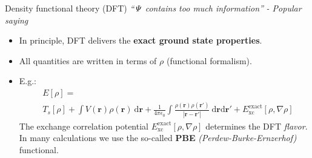 \documentclass[notes=hide]{beamer}
\begin{document}
\begin{frame}{Density functional theory (DFT)}
  \textit{``$ \it \Psi  $  contains too much information''}
  \hfill \textit{- Popular saying}
  \begin{itemize}
    \item In principle, DFT delivers the \textbf{exact ground state properties}.

    \item All quantities are written in terms of $ \rho $ (functional formalism).
    \item E.g.:
      \begin{align*}
        &E[ \rho ] =\\
        &T_{s} [ \rho  ]
        +
        \int  V ( \mathbf{r} ) \rho ( \mathbf{r} ) \ \mathrm{d} \mathbf{r}
        +
        \frac{1}{4\pi \epsilon _{0}}
        \int
        \frac{\rho ( \mathbf{r} ) \rho ( \mathbf{r}' )}{| \mathbf{r} - \mathbf{r}'|}
        \ \mathrm{d} \mathbf{r}\mathrm{d} \mathbf{r}'
        +
        E^{ \mathrm{exact}}_{ \mathrm{xc}} [ \rho, \nabla \rho  ]
      \end{align*}
      The exchange correlation potential
      $ E^{ \mathrm{exact}}_{ \mathrm{xc}} [ \rho , \nabla \rho  ] $
      determines the DFT \textit{flavor}.
      In many calculations we use the so-called \textbf{PBE} \textit{(Perdew-Burke-Ernzerhof)} functional.
  \end{itemize}
\end{frame}
\end{document}
